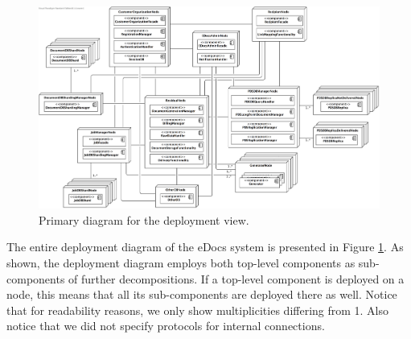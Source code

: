 \documentclass[a4paper,10pt]{article}
\begin{document}
\begin{figure}[!htp]
    \centering
	\includegraphics[height=0.9\textheight]{TotalDeployment.png}
    \caption{Primary diagram for the deployment view.}
    \label{fig:depl_primary}
\end{figure}
\FloatBarrier
\noindent
The entire deployment diagram of the eDocs system is presented in Figure \ref{fig:depl_primary}. As shown, the deployment diagram employs both top-level components as sub-components of further decompositions. If a top-level component is deployed on a node, this means that all its sub-components are deployed there as well. Notice that for readability reasons, we only show multiplicities differing from 1. Also notice that we did not specify protocols for internal connections.\\
\end{document}
